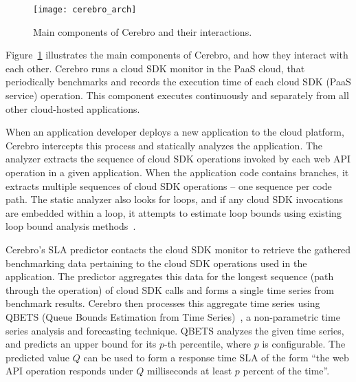 \begin{figure}
\centering
\texttt{[image: cerebro\_arch]}
\caption{Main components of Cerebro and their interactions.}
\label{fig:cerebro_arch}
\vspace{-0.2in}
\end{figure}

Figure~\ref{fig:cerebro_arch} illustrates the main components of Cerebro, and how they interact with
each other. Cerebro runs a cloud SDK monitor in the PaaS cloud, that periodically benchmarks and records
the execution time of each cloud SDK (PaaS service) operation.
This component executes continuously and separately from all other cloud-hosted applications.

When an application developer deploys a new
application to the cloud platform, Cerebro intercepts this process and statically analyzes the 
application.  The analyzer extracts the sequence of cloud SDK operations invoked by each
web API operation in a given application. When the application code contains branches, it
extracts multiple sequences of cloud SDK operations -- one sequence per code path. The static
analyzer also looks for loops, and if any cloud SDK invocations are embedded within a loop, 
it attempts to estimate loop bounds using existing loop bound analysis methods~\cite{bygde2010static}. 

Cerebro's SLA predictor contacts the cloud SDK monitor to retrieve the gathered benchmarking data
pertaining to the cloud SDK operations used in the application. The predictor aggregates
this data for the longest sequence (path through the operation) of cloud SDK calls and 
forms a single time series from benchmark results. 
Cerebro then processes this aggregate time series using QBETS (Queue
Bounds Estimation from Time Series)~\cite{Nurmi:2007:QQB:1791551.1791556}, a 
non-parametric time series analysis and forecasting technique. QBETS analyzes the given time 
series, and predicts an upper bound for its $p$-th percentile, where $p$ is configurable. The predicted
value $Q$ can be used to form a response time SLA of the form ``the web API operation responds 
under $Q$ milliseconds at least $p$ percent of the time''.

